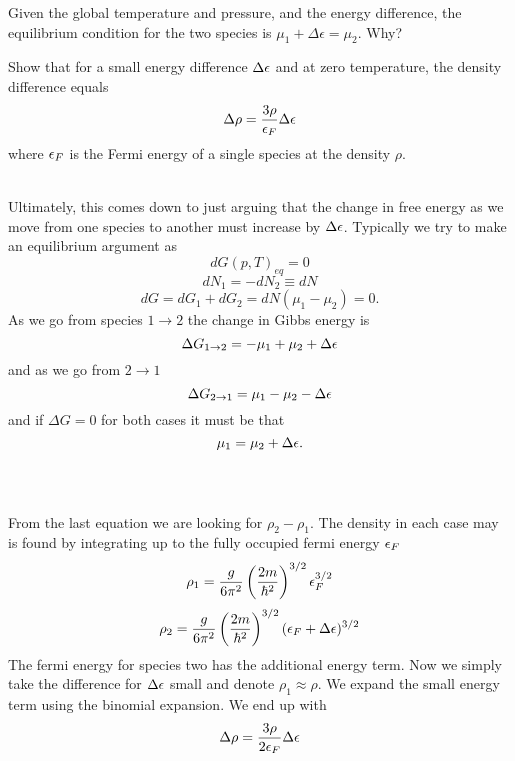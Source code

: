 \documentclass[10pt,letterpaper]{article}
\begin{document}
	\benum
	\item
	Given the global temperature and pressure, and the energy difference, the equilibrium condition for
	the two species is $\mu_1 +\Delta \epsilon = \mu_2$. Why?
	
	\item
	Show that for a small energy difference $\Delta \epsilon$ and at zero temperature, the density
	difference equals
	\[
		\Delta \rho = \frac{3\rho}{\epsilon_F}\Delta \epsilon
	\]
	where $\epsilon_F$ is the Fermi energy of a single species at the density $\rho$.
	\\ \\
	\eenum
	
	\benum
	\item
	Ultimately, this comes down to just arguing that the change in free energy as we move from one species to another
	must increase by $\Delta \epsilon$. Typically we try to make an equilibrium argument as 
	\[
		dG(p,T)_{eq} = 0
	\]
	\[
		dN_1 = -dN_2 \equiv dN
	\]
	\[
		dG = dG_1+dG_2 = dN(\mu_1-\mu_2) = 0.
	\]
	As we go from species $1\to 2$ the change in Gibbs energy is
	\[
		\Delta G_{1\to 2} = -\mu_1 +\mu_2+\Delta \epsilon
	\]
	and as we go from $2\to 1$
	\[
		\Delta G_{2\to 1}= \mu_1-\mu_2-\Delta \epsilon
	\]
	and if $\Delta G = 0$ for both cases it must be that
	\[
		\mu_1 = \mu_2+\Delta \epsilon.
	\]
	\\ \\
	
	\item
	From the last equation we are looking for $\rho_2-\rho_1$. The density in each case may is found by integrating up
	to the fully occupied fermi energy $\epsilon_F$
	\[
		\rho_1 = \frac{g}{6\pi^2}\left(\frac{2m}{\hbar^2}\right)^{3/2}\epsilon_F^{3/2}
	\]
	\[
		\rho_2 = \frac{g}{6\pi^2}\left(\frac{2m}{\hbar^2}\right)^{3/2}(\epsilon_F+\Delta\epsilon)^{3/2}
	\]
	The fermi energy for species two has the additional energy term. Now we simply take the difference 
	for $\Delta \epsilon$ small and denote $\rho_1 \approx \rho$. We expand the small energy term 
	using the binomial expansion. We end up with
	\[
		\Delta\rho = \frac{3\rho}{2\epsilon_F}\Delta\epsilon
	\]
	\\ \\
	\eenum
	
\end{document}
